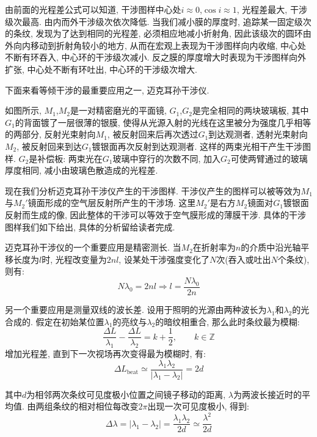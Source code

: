 由前面的光程差公式可以知道, 干涉图样中心处$i\approx 0$,$\cos i \approx 1$, 光程差最大, 干涉级次最高. 由内而外干涉级次依次降低. 当我们减小膜的厚度时, 追踪某一固定级次的条纹, 发现为了达到相同的光程差, 必须相应地减小折射角, 因此该级次的圆环由外向内移动到折射角较小的地方, 从而在宏观上表现为干涉图样向内收缩, 中心处不断有环吞入, 中心环的干涉级次减小. 反之膜的厚度增大时表现为干涉图样向外扩张, 中心处不断有环吐出, 中心环的干涉级次增大.

下面来看等倾干涉的最重要应用之一, 迈克耳孙干涉仪.


如图所示, $M_1$,$M_2$是一对精密磨光的平面镜, $G_1$,$G_2$是完全相同的两块玻璃板, 其中$G_1$的背面镀了一层很薄的银膜, 使得从光源入射的光线在这里被分为强度几乎相等的两部分, 反射光束射向$M_1$, 被反射回来后再次透过$G_1$到达观测者, 透射光束射向$M_2$, 被反射回来到达$G_1$镀银面再次反射到达观测者. 这样的两束光相干产生干涉图样. $G_2$是补偿板: 两束光在$G_1$玻璃中穿行的次数不同, 加入$G_2$可使两臂通过的玻璃厚度相同, 减小由玻璃色散造成的光程差.

现在我们分析迈克耳孙干涉仪产生的干涉图样. 干涉仪产生的图样可以被等效为$M_1$与$M_2'$镜面形成的空气层反射所产生的干涉场. 这里$M_2'$是右方$M_2$镜面对$G_1$镀银面反射而生成的像, 因此整体的干涉可以等效于空气膜形成的薄膜干涉. 具体的干涉图样我们如下给出, 具体的分析留给读者完成.




迈克耳孙干涉仪的一个重要应用是精密测长. 当$M_2$在折射率为$n$的介质中沿光轴平移长度为$l$时, 光程改变量为$2nl$, 设某处干涉强度变化了$N$次(吞入或吐出$N$个条纹), 则有:
\[
N \lambda_0 = 2nl \Rightarrow l = \frac{N\lambda_0}{2n}
\]

另一个重要应用是测量双线的波长差. 设用于照明的光源由两种波长为$\lambda_1$和$\lambda_2$的光合成的. 假定在初始某位置$\lambda_1$的亮纹与$\lambda_2$的暗纹相重合, 那么此时条纹最为模糊:
\[
\frac{\Delta L}{\lambda_1}-\frac{\Delta L}{\lambda_2}=k+\frac12,\qquad k\in\mathbb Z
\]
增加光程差, 直到下一次视场再次变得最为模糊时, 有:
\[
\Delta L_{\mathrm{beat}}\simeq\frac{\lambda_1\lambda_2}{|\lambda_1-\lambda_2|}=2d
\]

其中$d$为相邻两次条纹可见度极小位置之间镜子移动的距离, $\lambda$为两波长接近时的平均值. 由两组条纹的相对相位每改变$2\pi$出现一次可见度极小, 得到:
\[
\Delta\lambda=|\lambda_1-\lambda_2|=\frac{\lambda_1\lambda_2}{2d}\simeq\frac{\lambda^2}{2d}
\]

